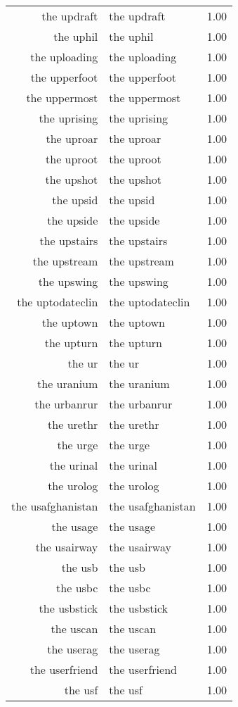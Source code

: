 \begin{table}[ht]
\begin{tabular}{rlr}
  the updraft & the updraft & 1.00 \\ 
  the uphil & the uphil & 1.00 \\ 
  the uploading & the uploading & 1.00 \\ 
  the upperfoot & the upperfoot & 1.00 \\ 
  the uppermost & the uppermost & 1.00 \\ 
  the uprising & the uprising & 1.00 \\ 
  the uproar & the uproar & 1.00 \\ 
  the uproot & the uproot & 1.00 \\ 
  the upshot & the upshot & 1.00 \\ 
  the upsid & the upsid & 1.00 \\ 
  the upside & the upside & 1.00 \\ 
  the upstairs & the upstairs & 1.00 \\ 
  the upstream & the upstream & 1.00 \\ 
  the upswing & the upswing & 1.00 \\ 
  the uptodateclin & the uptodateclin & 1.00 \\ 
  the uptown & the uptown & 1.00 \\ 
  the upturn & the upturn & 1.00 \\ 
  the ur & the ur & 1.00 \\ 
  the uranium & the uranium & 1.00 \\ 
  the urbanrur & the urbanrur & 1.00 \\ 
  the urethr & the urethr & 1.00 \\ 
  the urge & the urge & 1.00 \\ 
  the urinal & the urinal & 1.00 \\ 
  the urolog & the urolog & 1.00 \\ 
  the usafghanistan & the usafghanistan & 1.00 \\ 
  the usage & the usage & 1.00 \\ 
  the usairway & the usairway & 1.00 \\ 
  the usb & the usb & 1.00 \\ 
  the usbc & the usbc & 1.00 \\ 
  the usbstick & the usbstick & 1.00 \\ 
  the uscan & the uscan & 1.00 \\ 
  the userag & the userag & 1.00 \\ 
  the userfriend & the userfriend & 1.00 \\ 
  the usf & the usf & 1.00 \\ 

\end{tabular}
\end{table}
